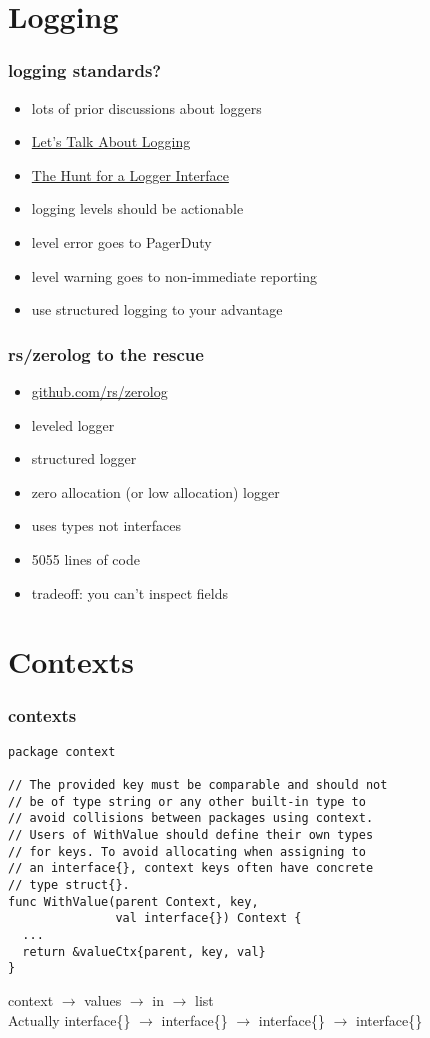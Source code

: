 \documentclass{beamer}
\begin{document}
\section{Logging}

\begin{frame}
\frametitle{logging standards?}
\begin{itemize}
\item lots of prior discussions about loggers
\item \href{https://dave.cheney.net/2015/11/05/lets-talk-about-logging}{Let's Talk About Logging}
\item \href{https://go-talks.appspot.com/github.com/ChrisHines/talks/structured-logging/structured-logging.slide}{The Hunt for a Logger Interface}
\item logging levels should be actionable
\item level error goes to PagerDuty
\item level warning goes to non-immediate reporting
\item use structured logging to your advantage
\end{itemize}
\end{frame}

\begin{frame}
\frametitle{rs/zerolog to the rescue}
\begin{itemize}
\item \href{https://github.com/rs/zerolog}{github.com/rs/zerolog}
\item leveled logger
\item structured logger
\item zero allocation (or low allocation) logger
\item uses types not interfaces
\item 5055 lines of code
\item tradeoff: you can't inspect fields
\end{itemize}
\end{frame}

\section{Contexts}

\begin{frame}[fragile]
\frametitle{contexts}
\begin{lstlisting}[basicstyle=\ttfamily\footnotesize]
package context

// The provided key must be comparable and should not
// be of type string or any other built-in type to
// avoid collisions between packages using context.
// Users of WithValue should define their own types
// for keys. To avoid allocating when assigning to
// an interface{}, context keys often have concrete
// type struct{}.
func WithValue(parent Context, key,
               val interface{}) Context {
  ...
  return &valueCtx{parent, key, val}
}
\end{lstlisting}
context $\rightarrow$ values $\rightarrow$ in $\rightarrow$ list \\
\pause
Actually interface\{\} $\rightarrow$ interface\{\} $\rightarrow$ interface\{\}
$\rightarrow$ interface\{\}
\end{frame}
\end{document}
